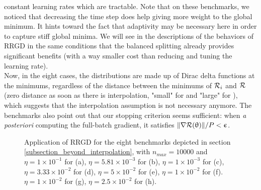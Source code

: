 \documentclass[article,authoryear,jmlmc]{beg_32}             %
\begin{document}
constant learning
rates which are tractable. 
Note that on these benchmarks, we noticed that decreasing the time step does help giving more weight to the global minimum. 
It hints toward the fact that adaptivity may be necessary here in order to capture stiff global minima.  
We will see in the descriptions of the behaviors of RRGD in the same conditions that the balanced splitting already provides significant benefits (with a way smaller cost
than reducing and tuning the learning rate). \\ 
Now, in the eight cases, the distributions are made up of Dirac delta functions at the minimums, regardless of the distance between the minimums of $\mathcal{R}_i$ and $\mathcal{R}$ (zero distance as
soon as there is interpolation, "small" for \exThree and "large" for \exFour), which suggests that the interpolation assumption is not necessary anymore. 
The benchmarks also point out that
our stopping criterion seems sufficient: when {\em a posteriori} computing the full-batch gradient, it satisfies $\|\nabla \mathcal{R}(\uptheta)\|/P<\upepsilon$. \\
\begin{figure}[h!]
	\centering
	\scalebox{0.60}{}
	\caption{
          Application of RRGD for the eight benchmarks depicted in section \ref{subsection_beyond_interpolation}, with $n_{max}=10000$ and 
 $\eta = 1   \times 10^{-1}$  for \exOne    (a), 
 $\eta = 5.81\times 10^{-3}$  for \exTwo    (b), 
 $\eta = 1   \times 10^{-3}$  for \exThree  (c), 
 $\eta = 3.33\times 10^{-2}$  for \exFour   (d), 
 $\eta = 5   \times 10^{-2}$  for \exFive   (e), 
 $\eta = 1   \times 10^{-2}$  for \exSix    (f). 
 $\eta = 1   \times 10^{-2}$  for \exSeven  (g), 
 $\eta = 2.5 \times 10^{-2}$  for \exHeight (h). 
}
	\label{SGD_exs_001}
\end{figure}
\end{document}
